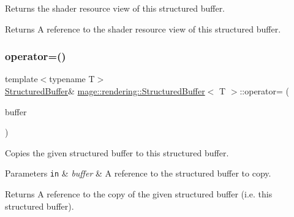 Returns the shader resource view of this structured buffer.

\begin{DoxyReturn}{Returns}
A reference to the shader resource view of this structured buffer. 
\end{DoxyReturn}
\mbox{\label{classmage_1_1rendering_1_1_structured_buffer_a646a5540b88c4a4262b4c6649934c368}} 
\subsubsection{\texorpdfstring{operator=()}{operator=()}\hspace{0.1cm}{\footnotesize\ttfamily [1/2]}}
{\footnotesize\ttfamily template$<$typename T$>$ \\
\mbox{\hyperlink{classmage_1_1rendering_1_1_structured_buffer}{Structured\+Buffer}}\& \mbox{\hyperlink{classmage_1_1rendering_1_1_structured_buffer}{mage\+::rendering\+::\+Structured\+Buffer}}$<$ T $>$\+::operator= (\begin{DoxyParamCaption}\item[{const \mbox{\hyperlink{classmage_1_1rendering_1_1_structured_buffer}{Structured\+Buffer}}$<$ T $>$ \&}]{buffer }\end{DoxyParamCaption})\hspace{0.3cm}{\ttfamily [delete]}}

Copies the given structured buffer to this structured buffer.


\begin{DoxyParams}[1]{Parameters}
\mbox{\tt in}  & {\em buffer} & A reference to the structured buffer to copy. \\
\hline
\end{DoxyParams}
\begin{DoxyReturn}{Returns}
A reference to the copy of the given structured buffer (i.\+e. this structured buffer). 
\end{DoxyReturn}
\mbox{\label{classmage_1_1rendering_1_1_structured_buffer_ad5ac95b375a2ca537abd61706746bb58}} 
